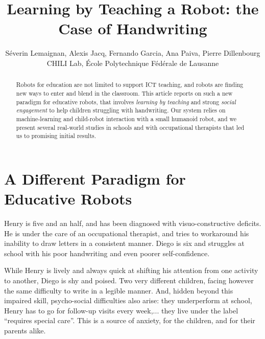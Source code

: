 \documentclass{article}
\title{Learning by Teaching a Robot: the Case of Handwriting}
\author{S\'everin Lemaignan, Alexis Jacq, Fernando Garcia, Ana Paiva, Pierre
Dillenbourg \\ CHILI Lab, \'Ecole Polytechnique F\'ed\'erale de Lausanne}
\begin{document}
\maketitle

\begin{abstract}

    Robots for education are not limited to support ICT teaching, and robots are
    finding new ways to enter and blend in the classroom. This article reports
    on such a new paradigm for educative robots, that involves \emph{learning by
    teaching} and strong \emph{social engagement} to help children struggling
    with handwriting. Our system relies on machine-learning and child-robot
    interaction with a small humanoid robot, and we present several real-world
    studies in schools and with occupational therapists that led us to promising
    initial results.

\end{abstract}


\section{A Different Paradigm for Educative Robots}

Henry is five and an half, and has been diagnosed with visuo-constructive
deficits. He is under the care of an occupational therapist, and tries to
workaround his inability to draw letters in a consistent manner. Diego is six
and struggles at school with his poor handwriting and even poorer
self-confidence.

While Henry is lively and always quick at shifting his attention from one
activity to another, Diego is shy and poised. Two very different children,
facing however the same difficulty to write in a legible manner. And, hidden
beyond this impaired skill, psycho-social difficulties also arise: they
underperform at school, Henry has to go for follow-up visits every week,...
they live under the label ``requires special care''. This is a source of
anxiety, for the children, and for their parents alike.
\end{document}

